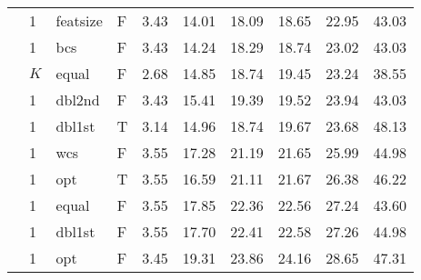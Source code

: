 \begin{table}[ht]
\begin{minipage}{\textwidth}
\begin{tabular}{llllrrrrrr}
  & 1 & featsize & F & 3.43 & 14.01 & 18.09 & 18.65 & 22.95 & 43.03 \\ 
  & 1 & bcs & F & 3.43 & 14.24 & 18.29 & 18.74 & 23.02 & 43.03 \\ 
  & $K$ & equal & F & 2.68 & 14.85 & 18.74 & 19.45 & 23.24 & 38.55 \\ 
  & 1 & dbl2nd & F & 3.43 & 15.41 & 19.39 & 19.52 & 23.94 & 43.03 \\ 
  & 1 & dbl1st & T & 3.14 & 14.96 & 18.74 & 19.67 & 23.68 & 48.13 \\ 
  & 1 & wcs & F & 3.55 & 17.28 & 21.19 & 21.65 & 25.99 & 44.98 \\ 
  & 1 & opt & T & 3.55 & 16.59 & 21.11 & 21.67 & 26.38 & 46.22 \\ 
  & 1 & equal & F & 3.55 & 17.85 & 22.36 & 22.56 & 27.24 & 43.60 \\ 
  & 1 & dbl1st & F & 3.55 & 17.70 & 22.41 & 22.58 & 27.26 & 44.98 \\ 
  & 1 & opt & F & 3.45 & 19.31 & 23.86 & 24.16 & 28.65 & 47.31 \\ 
 \bottomrule
\end{tabular}
\end{minipage}
\end{table}